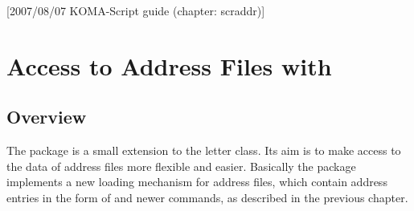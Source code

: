 %
%
%
%
%
%
%
%
% 
%
%
%
%

[2007/08/07 KOMA-Script guide (chapter: scraddr)]

\chapter{Access to Address Files with }%
%

\section{Overview}\label{sec:scraddr.overview}
The package  is a small extension to the
{\KOMAScript} letter class.  Its aim is to make access to the data of
address files more flexible and easier.  Basically the package
implements a new loading mechanism for address files, which contain
address entries in the form of  and newer
 commands, as described in the previous chapter.

